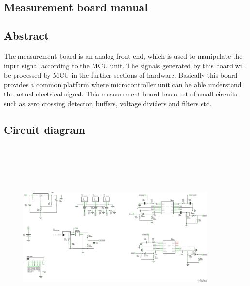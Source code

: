 \documentclass[a4paper,12pt,oneside]{book}
\begin{document}
\begin{appendices}
\chapter{Measurement board manual}
\label{100}
\section{Abstract}
\hspace{7mm} The measurement board is an analog front end, which is used to manipulate the input signal according to the MCU unit. The signals generated by this board will be processed by MCU in the further sections of hardware. Basically this board provides a common platform where microcontroller unit can be able understand the actual electrical signal. This measurement board has a set of small circuits such as zero crossing detector, buffers, voltage dividers and filters etc.  

\newpage
\section{Circuit diagram}
\begin{figure}[h]
	\includegraphics[width=380px,height=380px]{schematic}
\end{figure}
\newpage

\end{appendices}
\end{document}
